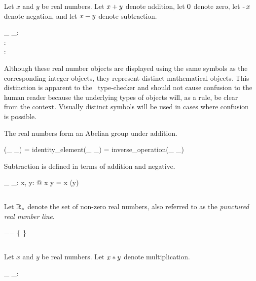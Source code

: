 \documentclass[11pt, oneside]{article}
\begin{document}
Let $x$ and $y$ be real numbers.
Let $x \mathbin{+} y$ denote addition,
let $0$ denote zero,
let $\operatorname{-} x$ denote negation,
and let $x \mathbin{-} y$ denote subtraction.

\begin{axdef}
	\_ \addR \_: \R \cross \R \fun \R \\
	\zeroR: \R \\
	\negR: \R \fun \R
\end{axdef}

Although these real number objects are displayed using the same symbols as the corresponding integer objects,
they represent distinct mathematical objects.
This distinction is apparent to the \fuzz\ type-checker and should not cause confusion to the human reader
because the underlying types of objects will, as a rule, be clear from the context.
Visually distinct symbols will be used in cases where confusion is possible.

The real numbers form an Abelian group under addition.

\begin{zed}
(\_ \addR \_) \in \abgroup \R
\also
\zeroR = identity\_element(\_ \addR \_)
\also
\negR = inverse\_operation(\_ \addR \_)
\end{zed}

Subtraction is defined in terms of addition and negative.

\begin{axdef}
	\_ \subR \_: \R \cross \R \fun \R
	\where
	\forall x, y: \R @ x \subR y = x \addR (\negR y)
\end{axdef}

\subsection{}

Let $\mathbb{R}_{*}$ denote the set of non-zero real numbers,
also referred to as the {\it punctured real number line}.

\begin{zed}
	\Rnz == \R \setminus \{ \zeroR \}
\end{zed}

\subsection{}

Let $x$ and $y$ be real numbers.
Let $x \mathbin{*} y$ denote multiplication.

\begin{axdef}
	\_ \mulR \_: \R \cross \R \fun \R
\end{axdef}
\end{document}
